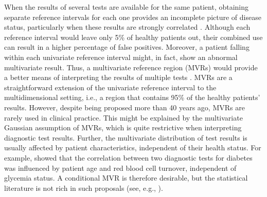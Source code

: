 
When the results of several tests are available for the same patient, obtaining separate reference intervals for each one provides an incomplete picture of disease status, particularly when these results are strongly correlated \citep{boyd2004reference}. Although each reference interval would leave only 5\% of healthy patients out, their combined use can result in a higher percentage of false positives. Moreover, a patient falling within each univariate reference interval might, in fact, show an abnormal multivariate result. Thus, a multivariate reference region (MVRs) would provide a better means of interpreting the results of multiple tests \citep{winkel1972normal}. MVRs are a straightforward extension of the univariate reference interval to the multidimensional setting, i.e., a region that contains 95\% of the healthy patients' results. However, despite being proposed more than 40 years ago, MVRs are rarely used in clinical practice. This might be explained by the multivariate Gaussian assumption of MVRs, which is quite restrictive when interpreting diagnostic test results. Further, the multivariate distribution of test results is usually affected by patient characteristics, independent of their health status. For example, \cite{espasandin2019assessing} showed that the correlation between two diagnostic tests for diabetes was influenced by patient age and red blood cell turnover, independent of glycemia status. A conditional MVR is therefore desirable, but the statistical literature is not rich in such proposals (see, e.g., \citep{wei2008approach}).


